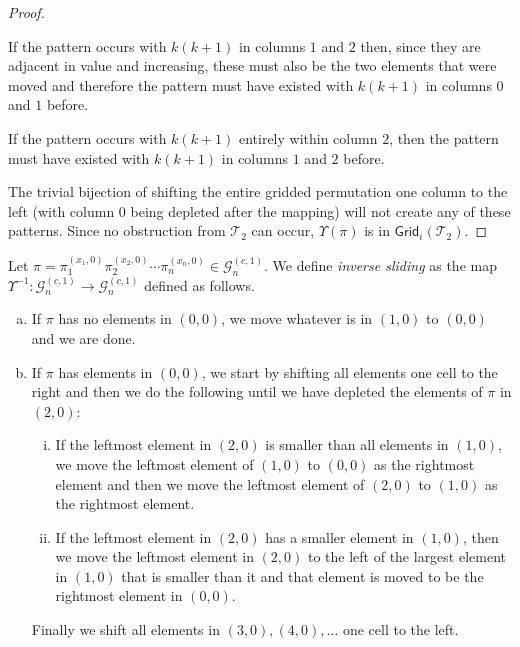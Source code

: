\begin{proof}
\begin{center}

\end{center}

If the pattern occurs with $k(k+1)$ in columns $1$ and $2$ then, since they are adjacent in value and increasing, these must also be the two elements that were moved and therefore the pattern must have existed with $k(k+1)$ in columns $0$ and $1$ before.

\begin{center}

\end{center}

If the pattern occurs with $k(k+1)$ entirely within column $2$, then the pattern must have existed with $k(k+1)$ in columns $1$ and $2$ before.

\begin{center}

\end{center}

The trivial bijection of shifting the entire gridded permutation one column to the left (with column $0$ being depleted after the mapping) will not create any of these patterns. Since no obstruction from $\mathcal{T}_2$ can occur, $\Upsilon(\pi)$ is in $\textsf{Grid}_i(\mathcal{T}_2)$.
\end{proof}

\begin{definition}
Let $\pi = \pi_1^{(x_1,0)}\pi_2^{(x_2,0)}\cdots\pi_n^{(x_n,0)} \in \mathcal{G}^{(c,1)}_n$. We define \emph{inverse sliding} as the map $\Upsilon^{-1}: \mathcal{G}^{(c,1)}_n \to \mathcal{G}^{(c,1)}_n$ defined as follows.
\begin{enumerate}[a)]
    \item If $\pi$ has no elements in $(0,0)$, we move whatever is in $(1,0)$ to $(0,0)$ and we are done.
    \item If $\pi$ has elements in $(0,0)$, we start by shifting all elements one cell to the right and then we do the following until we have depleted the elements of $\pi$ in $(2,0)$:
    \begin{enumerate}[i.]
        \item If the leftmost element in $(2,0)$ is smaller than all elements in $(1,0)$, we move the leftmost element of $(1,0)$ to $(0,0)$ as the rightmost element and then we move the leftmost element of $(2,0)$ to $(1,0)$ as the rightmost element.
        \item If the leftmost element in $(2,0)$ has a smaller element in $(1,0)$, then we move the leftmost element in $(2,0)$ to the left of the largest element in $(1,0)$ that is smaller than it and that element is moved to be the rightmost element in $(0,0)$.
    \end{enumerate}
    Finally we shift all elements in $(3,0), (4,0), \ldots$ one cell to the left.
\end{enumerate}
\end{definition}

